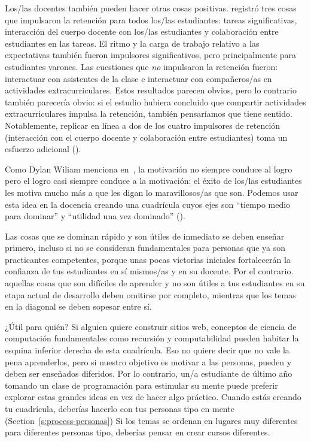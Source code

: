 Los/las docentes también pueden hacer otras cosas positivas.
\cite{Bark2014} registró tres cosas que impulsaron la retención para todos los/las estudiantes:
tareas significativas,
interacción del cuerpo docente con los/las estudiantes
y colaboración entre estudiantes en las tareas.
El ritmo y la carga de trabajo relativo a las expectativas también fueron impulsores significativos,
pero principalmente para estudiantes varones.
Las cuestiones que \emph{no} impulsaron la retención
fueron: interactuar con asistentes de la clase
e interactuar con compañeros/as en actividades extracurriculares.
Estos resultados parecen obvios,
pero lo contrario también parecería obvio:
si el estudio hubiera concluido que compartir actividades extracurriculares
impulsa la retención,
también pensaríamos que tiene sentido.
Notablemente,
replicar en línea a dos de los cuatro impulsores de retención (interacción  con el cuerpo docente y colaboración entre estudiantes)
toma un esfuerzo adicional ().


Como Dylan Wiliam menciona en~\cite{Hend2017},
la motivación no siempre conduce al logro 
pero el logro casi siempre conduce a la motivación:
el éxito de los/las estudiantes les motiva mucho más a que les digan lo maravillosos/as que son.
Podemos usar esta idea en la docencia
creando una cuadrícula cuyos ejes son ``tiempo medio para dominar''
y ``utilidad una vez dominado'' ().


Las cosas que se dominan rápido y son útiles de inmediato se deben enseñar primero,
incluso si no se consideran fundamentales para personas que ya son practicantes competentes,
porque unas pocas victorias iniciales fortalecerán la confianza de tus estudiantes en sí mismos/as y en su docente.
Por el contrario.
aquellas cosas que son difíciles de aprender y no son útiles a tus estudiantes en su etapa actual de desarrollo
deben omitirse por completo,
mientras que los temas en la diagonal se deben sopesar entre sí.

\newpage
\begin{aside}{¿Útil para quién?}
  Si alguien quiere construir sitios web,
  conceptos de ciencia de computación fundamentales como recursión y computabilidad
  pueden habitar la esquina inferior derecha de esta cuadrícula. 
  Eso no quiere decir que no vale la pena aprenderlos,
  pero si nuestro objetivo es motivar a las personas,
  pueden y deben ser enseñados diferidos.
  Por lo contrario,
  un/a estudiante de último año tomando un clase de programación para estimular su mente
  puede preferir explorar estas grandes ideas en vez de hacer algo práctico.
  Cuando estás creando tu cuadrícula,
  deberías hacerlo con tus personas tipo en mente
  (Section~\ref{s:process-personas})
  Si los temas se ordenan en lugares muy diferentes para diferentes personas tipo,
  deberías pensar en crear cursos diferentes.
\end{aside}


